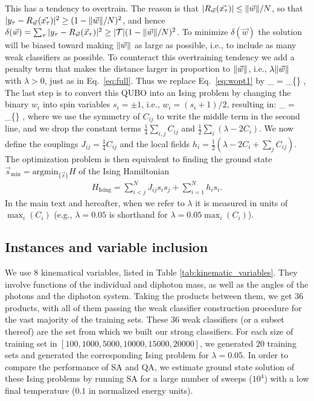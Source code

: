 \documentclass[.chapters/Higgs/.chapters/Higgs/main.tex]{subfiles}
\begin{document}
This has a tendency to overtrain. The reason is that $|R_{\vec{w}}(\vec{x_\tau})| \leq {\norm{\vec{w}}}/{N}$, so that $|y_\tau-R_{\vec{w}}(\vec{x_\tau})|^2 \geq (1-\norm{\vec{w}}/{N})^2$, and hence $\delta(\vec{w}) = \sum_\tau |y_\tau-R_{\vec{w}}(\vec{x}_\tau)|^2 \geq |\mathcal{T}| (1-{\norm{\vec{w}}}/{N})^2$. To minimize $\delta(\vec{w})$ the solution will be biased toward making $\norm{\vec{w}}$ as large as possible, i.e., to include as many weak classifiers as possible. To counteract this overtraining tendency we add a penalty term that makes the distance larger in proportion to $\norm{\vec{w}}$, i.e., $\lambda\norm{\vec{w}}$ with $\lambda>0$, just as in Eq.~\eqref{eq:full}. Thus we replace Eq.~\eqref{eq:wopt1} by
\beq
{}_{\min}  = _{\{\}}  ,
\label{eq:wopt2}
\eeq
The last step is to convert this QUBO into an Ising problem by changing the binary $w_i$ into spin variables $s_i=\pm 1$, i.e., $w_i= (s_i+1)/2$, resulting in:
\beq
{}_{\min}  = _{\{\}}  ,
\eeq
where we use the symmetry of $C_{ij}$ to write the middle term in the second line, and we drop the constant terms $\frac{1}{4}\sum_{i,j} C_{ij}$ and $\frac{1}{2}\sum_i (\lambda-2C_i)$.
We now define the couplings $J_{ij} = \frac{1}{4} C_{ij}$ and the local fields $h_i=\frac{1}{2}\left(\lambda-2C_i+\sum_{j}C_{ij} \right)$. The optimization problem is then equivalent to finding the ground state 
$\vec{s}_{\min} = \mathrm{argmin}_{\{\vec{s}\}} H$ of the Ising Hamiltonian
 \begin{align}
 		H_{\mathrm{Ising}} =  \sum_{i<j}^{N} J_{ij} s_i s_j + \sum_{i=1}^{N} h_i s_i .
		\label{eq:HIsing}
 \end{align}
In the main text and hereafter, when we refer to $\lambda$ it is measured in units of $\max_i(C_i)$ (e.g., $\lambda=0.05$ is shorthand for $\lambda=0.05\max_i(C_i)$).
 

\subsection*{Instances and variable inclusion}
We use $8$ kinematical variables, listed in Table \ref{tab:kinematic_variables}. They involve functions of the individual and diphoton mass, as well as the angles of the photons and the diphoton system. Taking the products between them, we get $36$ products, with all of them passing the weak classifier construction procedure for the vast majority of the training sets. These $36$ weak classifiers (or a subset thereof) are the set from which we built our strong classifiers.  For each size of training set in $[100,1000,5000,10000,15000,20000]$, we generated $20$ training sets and generated the corresponding Ising problem for $\lambda=0.05$. In order to compare the performance of SA and QA, we estimate ground state solution of these Ising problems by running SA for a large number of sweeps ($10^4$) with a low final temperature ($0.1$ in normalized energy units).
\end{document}
